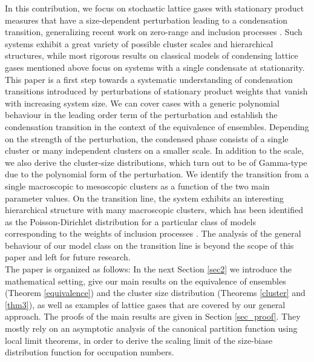 \documentclass[pdflatex,sn-mathphys-num]{sn-jnl}%
\theoremstyle{thmstyleone}%
\theoremstyle{thmstyletwo}%
\theoremstyle{thmstylethree}%
\begin{document}
In this contribution, we focus on stochastic lattice gases with stationary product measures that have a size-dependent perturbation leading to a condensation transition, generalizing recent work on zero-range \cite{JG2024ZRPfastrate} and inclusion processes \cite{bib_JCG20,gan2025poisson}. Such systems exhibit a great variety of possible cluster scales and hierarchical structures, while most rigorous results on classical models of condensing lattice gases mentioned above focus on systems with a single condensate at stationarity. This paper is a first step towards a systematic understanding of condensation transitions introduced by perturbations of stationary product weights that vanish with increasing system size. We can cover cases with a generic polynomial behaviour in the leading order term of the perturbation and establish the condensation transition in the context of the equivalence of ensembles. Depending on the strength of the perturbation, the condensed phase consists of a single cluster or many independent clusters on a smaller scale. In addition to the scale, we also derive the cluster-size distributions, which turn out to be of Gamma-type due to the polynomial form of the perturbation. We identify the transition from a single macroscopic to mesoscopic clusters as a function of the two main parameter values. On the transition line, the system exhibits an interesting hierarchical structure with many macroscopic clusters, which has been identified as the Poisson-Dirichlet distribution for a particular class of models corresponding to the weights of inclusion processes \cite{bib_CGG22,gan2025poisson}. The analysis of the general behaviour of our model class on the transition line is beyond the scope of this paper and left for future research.\\



The paper is organized as follows: In the next Section \ref{sec2} we introduce the mathematical setting, give our main results on the equivalence of ensembles (Theorem \ref{equivalence}) and the cluster size distribution (Theorems \ref{cluster} and \ref{thm3}), as well as examples of lattice gases that are covered by our general approach. The proofs of the main results are given in Section \ref{sec_proof}. They mostly rely on an asymptotic analysis of the canonical partition function using local limit theorems, in order to derive the scaling limit of the size-biase distribution function for occupation numbers.
\end{document}
